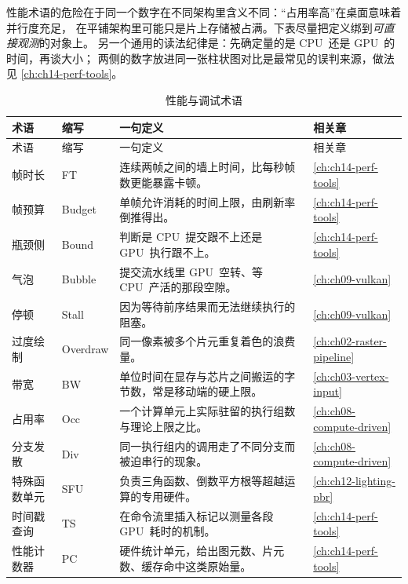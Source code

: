 \documentclass[12pt,a4paper,fontset=fandol]{ctexbook}
\newcommand{\Lang}[1]{\textsf{#1}}
\newcommand{\DomCPU}{\Lang{CPU}}
\newcommand{\DomGPU}{\Lang{GPU}}
\begin{document}
性能术语的危险在于同一个数字在不同架构里含义不同：``占用率高''在桌面意味着并行度充足，
在平铺架构里可能只是片上存储被占满。下表尽量把定义绑到\emph{可直接观测}的对象上。
另一个通用的读法纪律是：先确定量的是 \DomCPU\ 还是 \DomGPU\ 的时间，再谈大小；
两侧的数字放进同一张柱状图对比是最常见的误判来源，做法见 \ref{ch:ch14-perf-tools}。

\begin{longtable}{>{\raggedright\arraybackslash}p{}
                  >{\raggedright\arraybackslash\small}p{}
                  >{\raggedright\arraybackslash}p{}
                  >{\raggedright\arraybackslash}p{}}
\caption{性能与调试术语}\label{tab:apA-perf} \\
\toprule
术语 & 缩写 & 一句定义 & 相关章 \\
\midrule
\endfirsthead
\toprule
术语 & 缩写 & 一句定义 & 相关章 \\
\midrule
\endhead
\bottomrule
\endfoot
帧时长 & FT & 连续两帧之间的墙上时间，比每秒帧数更能暴露卡顿。 & \ref{ch:ch14-perf-tools} \\
帧预算 & Budget & 单帧允许消耗的时间上限，由刷新率倒推得出。 & \ref{ch:ch14-perf-tools} \\
瓶颈侧 & Bound & 判断是 \DomCPU\ 提交跟不上还是 \DomGPU\ 执行跟不上。 & \ref{ch:ch14-perf-tools} \\
气泡 & Bubble & 提交流水线里 \DomGPU\ 空转、等 \DomCPU\ 产活的那段空隙。 & \ref{ch:ch09-vulkan} \\
停顿 & Stall & 因为等待前序结果而无法继续执行的阻塞。 & \ref{ch:ch09-vulkan} \\
过度绘制 & Overdraw & 同一像素被多个片元重复着色的浪费量。 & \ref{ch:ch02-raster-pipeline} \\
带宽 & BW & 单位时间在显存与芯片之间搬运的字节数，常是移动端的硬上限。 & \ref{ch:ch03-vertex-input} \\
占用率 & Occ & 一个计算单元上实际驻留的执行组数与理论上限之比。 & \ref{ch:ch08-compute-driven} \\
分支发散 & Div & 同一执行组内的调用走了不同分支而被迫串行的现象。 & \ref{ch:ch08-compute-driven} \\
特殊函数单元 & SFU & 负责三角函数、倒数平方根等超越运算的专用硬件。 & \ref{ch:ch12-lighting-pbr} \\
时间戳查询 & TS & 在命令流里插入标记以测量各段 \DomGPU\ 耗时的机制。 & \ref{ch:ch14-perf-tools} \\
性能计数器 & PC & 硬件统计单元，给出图元数、片元数、缓存命中这类原始量。 & \ref{ch:ch14-perf-tools} \\

\end{longtable}
\end{document}
